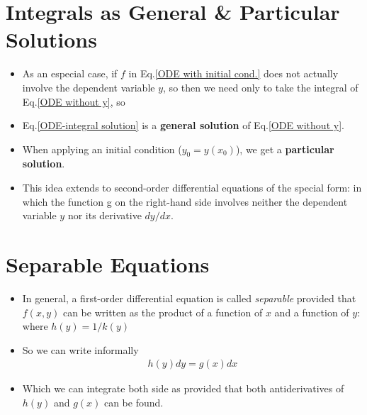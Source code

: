     \section{Integrals as General \& Particular Solutions}
        \begin{itemize}
            \item As an especial case, if $f$ in Eq.\eqref{ODE with initial cond.} 
                does not actually involve the dependent variable $y$, so
                then we need only to take the integral of Eq.\eqref{ODE without y}, so 
            \item Eq.\eqref{ODE-integral solution} is a \textbf{general solution} of Eq.\eqref{ODE without y}.
            \item When applying an initial condition ($y_0=y(x_0)$), we get a \textbf{particular solution}.
            \item This idea extends to second-order differential equations of the special form:
                in which the function g on the right-hand side involves neither the dependent
                variable $y$ nor its derivative $dy/dx$.                
        \end{itemize}

    \section{Separable Equations}
        \begin{itemize}
            \item In general, a first-order differential equation is called \textit{separable} 
            provided that $f(x,y)$ can be written as the product of a function of $x$ and a function of $y$:
            where $h(y)=1/k(y)$
            \item So we can write informally
            \begin{align} \label{separable ODE:1}
                h(y)dy = g(x)dx
            \end{align}
            \item Which we can integrate both side as
            provided that both antiderivatives of $h(y)$ and $g(x)$ can be found.
        \end{itemize}